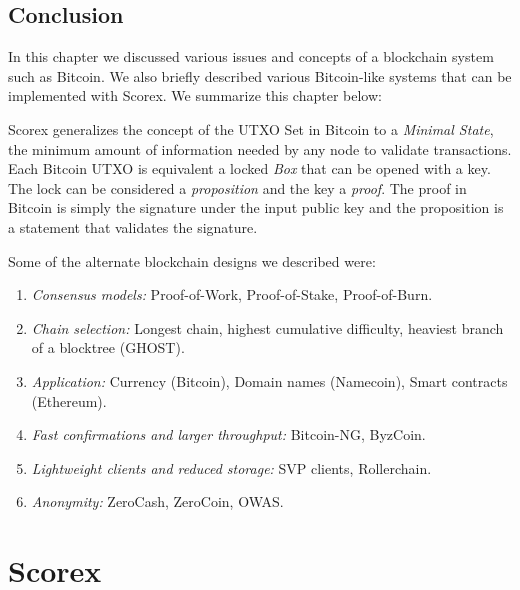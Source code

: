 \documentclass[]{report}   %
\begin{document}
\section{Conclusion}

In this chapter we discussed various issues and concepts of a blockchain system such as Bitcoin. We also briefly described various Bitcoin-like systems that can be implemented with Scorex. We summarize this chapter below:

Scorex generalizes the concept of the UTXO Set in Bitcoin to a {\em Minimal State}, the minimum amount of information needed by any node to validate transactions. Each Bitcoin UTXO is equivalent a locked {\em Box} that can be opened with a key. The lock can be considered a {\em proposition} and the key a {\em proof}. The proof in Bitcoin is simply the signature under the input public key and the proposition is a statement that validates the signature.

Some of the alternate blockchain designs we described were:

\begin{enumerate}
	\item {\em Consensus models:} Proof-of-Work, Proof-of-Stake, Proof-of-Burn.
	\item {\em Chain selection:} Longest chain, highest cumulative difficulty, heaviest branch of a blocktree (GHOST).
	\item {\em Application:} Currency (Bitcoin), Domain names (Namecoin), Smart contracts (Ethereum).
	\item {\em Fast confirmations and larger throughput:} Bitcoin-NG, ByzCoin.
	\item {\em Lightweight clients and reduced storage:} SVP clients, Rollerchain.
	\item {\em Anonymity:} ZeroCash, ZeroCoin, OWAS.
\end{enumerate}




%
%
%
%
%

\chapter{Scorex}           %
\end{document}
